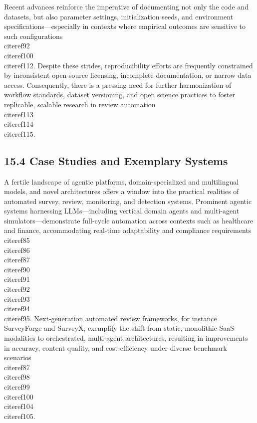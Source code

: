 \documentclass[11pt]{article}
\begin{document}
Recent advances reinforce the imperative of documenting not only the code and datasets, but also parameter settings, initialization seeds, and environment specifications—especially in contexts where empirical outcomes are sensitive to such configurations~\\cite{ref92}\\cite{ref100}\\cite{ref112}. Despite these strides, reproducibility efforts are frequently constrained by inconsistent open-source licensing, incomplete documentation, or narrow data access. Consequently, there is a pressing need for further harmonization of workflow standards, dataset versioning, and open science practices to foster replicable, scalable research in review automation~\\cite{ref113}\\cite{ref114}\\cite{ref115}.

\subsection{15.4 Case Studies and Exemplary Systems}

A fertile landscape of agentic platforms, domain-specialized and multilingual models, and novel architectures offers a window into the practical realities of automated survey, review, monitoring, and detection systems. Prominent agentic systems harnessing LLMs—including vertical domain agents and multi-agent simulators—demonstrate full-cycle automation across contexts such as healthcare and finance, accommodating real-time adaptability and compliance requirements~\\cite{ref85}\\cite{ref86}\\cite{ref87}\\cite{ref90}\\cite{ref91}\\cite{ref92}\\cite{ref93}\\cite{ref94}\\cite{ref95}. Next-generation automated review frameworks, for instance SurveyForge and SurveyX, exemplify the shift from static, monolithic SaaS modalities to orchestrated, multi-agent architectures, resulting in improvements in accuracy, content quality, and cost-efficiency under diverse benchmark scenarios~\\cite{ref87}\\cite{ref98}\\cite{ref99}\\cite{ref100}\\cite{ref104}\\cite{ref105}.
\end{document}
